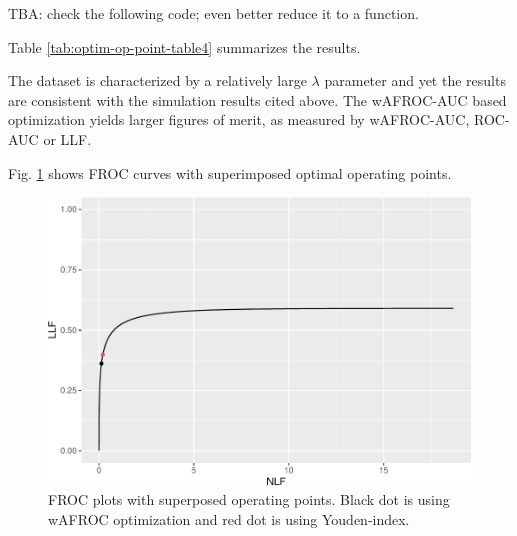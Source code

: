 \documentclass[
]{book}
\begin{document}
TBA: check the following code; even better reduce it to a function.

Table \ref{tab:optim-op-point-table4} summarizes the results.

\begin{table}[H]

\caption{\label{tab:optim-op-point-table4}Summary of optimization results for example FROC dataset. The wAFROC column always displays wAFROC-AUC, even though the optimized quantity may the Youden-index, as in the last four rows.}
\centering
{}
\end{table}

The dataset is characterized by a relatively large \(\lambda\) parameter and yet the results are consistent with the simulation results cited above. The wAFROC-AUC based optimization yields larger figures of merit, as measured by wAFROC-AUC, ROC-AUC or LLF.

Fig. \ref{fig:optim-op-point-application-froc} shows FROC curves with superimposed optimal operating points.

\begin{figure}
\centering
\includegraphics{21-optim-op-point_files/figure-latex/optim-op-point-application-froc-1.pdf}
\caption{\label{fig:optim-op-point-application-froc}FROC plots with superposed operating points. Black dot is using wAFROC optimization and red dot is using Youden-index.}
\end{figure}
\end{document}
